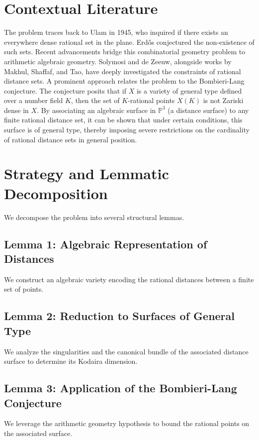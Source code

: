 \documentclass[12pt,a4paper]{article}
\begin{document}
\section{Contextual Literature}

The problem traces back to Ulam in 1945, who inquired if there exists an everywhere dense rational set in the plane. Erd\H{o}s conjectured the non-existence of such sets. Recent advancements bridge this combinatorial geometry problem to arithmetic algebraic geometry. Solymosi and de Zeeuw, alongside works by Makhul, Shaffaf, and Tao, have deeply investigated the constraints of rational distance sets. A prominent approach relates the problem to the Bombieri-Lang conjecture. The conjecture posits that if $X$ is a variety of general type defined over a number field $K$, then the set of $K$-rational points $X(K)$ is not Zariski dense in $X$. By associating an algebraic surface in $\mathbb{P}^3$ (a distance surface) to any finite rational distance set, it can be shown that under certain conditions, this surface is of general type, thereby imposing severe restrictions on the cardinality of rational distance sets in general position.

\section{Strategy and Lemmatic Decomposition}

We decompose the problem into several structural lemmas.

\subsection{Lemma 1: Algebraic Representation of Distances}
We construct an algebraic variety encoding the rational distances between a finite set of points.

\subsection{Lemma 2: Reduction to Surfaces of General Type}
We analyze the singularities and the canonical bundle of the associated distance surface to determine its Kodaira dimension.

\subsection{Lemma 3: Application of the Bombieri-Lang Conjecture}
We leverage the arithmetic geometry hypothesis to bound the rational points on the associated surface.
\end{document}
